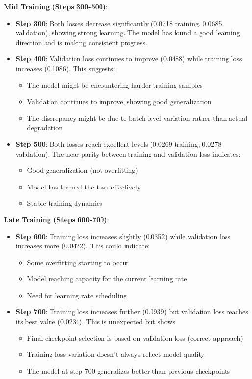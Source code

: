 \documentclass[conference]{IEEEtran}
\begin{document}
\textbf{Mid Training (Steps 300-500)}:
\begin{itemize}
    \item \textbf{Step 300}: Both losses decrease significantly (0.0718 training, 0.0685 validation), showing strong learning. The model has found a good learning direction and is making consistent progress.
    
    \item \textbf{Step 400}: Validation loss continues to improve (0.0488) while training loss increases (0.1086). This suggests:
    \begin{itemize}
        \item The model might be encountering harder training samples
        \item Validation continues to improve, showing good generalization
        \item The discrepancy might be due to batch-level variation rather than actual degradation
    \end{itemize}
    
    \item \textbf{Step 500}: Both losses reach excellent levels (0.0269 training, 0.0278 validation). The near-parity between training and validation loss indicates:
    \begin{itemize}
        \item Good generalization (not overfitting)
        \item Model has learned the task effectively
        \item Stable training dynamics
    \end{itemize}
\end{itemize}

\textbf{Late Training (Steps 600-700)}:
\begin{itemize}
    \item \textbf{Step 600}: Training loss increases slightly (0.0352) while validation loss increases more (0.0422). This could indicate:
    \begin{itemize}
        \item Some overfitting starting to occur
        \item Model reaching capacity for the current learning rate
        \item Need for learning rate scheduling
    \end{itemize}
    
    \item \textbf{Step 700}: Training loss increases further (0.0939) but validation loss reaches its best value (0.0234). This is unexpected but shows:
    \begin{itemize}
        \item Final checkpoint selection is based on validation loss (correct approach)
        \item Training loss variation doesn't always reflect model quality
        \item The model at step 700 generalizes better than previous checkpoints
    \end{itemize}
\end{itemize}
\end{document}
